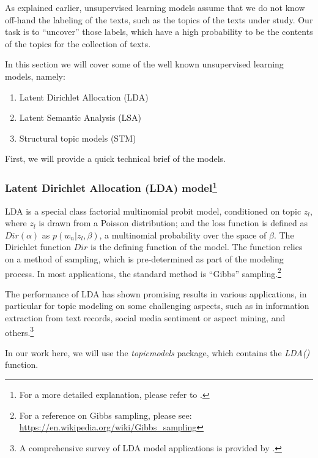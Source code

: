 \documentclass[
]{article}
\providecommand{\tightlist}{%
  \setlength{\itemsep}{0pt}\setlength{\parskip}{0pt}}
\begin{document}
As explained earlier, unsupervised learning models assume that we do not know off-hand the labeling of the texts, such as the topics of the texts under study. Our task is to ``uncover'' those labels, which have a high probability to be the contents of the topics for the collection of texts.

In this section we will cover some of the well known unsupervised learning models, namely:

\begin{enumerate}
\def\labelenumi{\arabic{enumi}.}
\tightlist
\item
  Latent Dirichlet Allocation (LDA)
\item
  Latent Semantic Analysis (LSA)
\item
  Structural topic models (STM)
\end{enumerate}

First, we will provide a quick technical brief of the models.

\hypertarget{latent-dirichlet-allocation-lda-model}{%
\subsubsection[Latent Dirichlet Allocation (LDA) model]{\texorpdfstring{Latent Dirichlet Allocation (LDA) model\footnote{For a more detailed explanation, please refer to \citep{blei2003}.}}{Latent Dirichlet Allocation (LDA) model}}\label{latent-dirichlet-allocation-lda-model}}

LDA is a special class factorial multinomial probit model, conditioned on topic \(z_l\), where \(z_l\) is drawn from a Poisson distribution; and the loss function is defined as \(Dir(\alpha)\) as \(p(w_n|z_l,\beta)\), a multinomial probability over the space of \(\beta\). The Dirichlet function \(Dir\) is the defining function of the model. The function relies on a method of sampling, which is pre-determined as part of the modeling process. In most applications, the standard method is ``Gibbs'' sampling.\footnote{For a reference on Gibbs sampling, please see: \url{https://en.wikipedia.org/wiki/Gibbs_sampling}}

The performance of LDA has shown promising results in various applications, in particular for topic modeling on some challenging aspects, such as in information extraction from text records, social media sentiment or aspect mining, and others.\footnote{A comprehensive survey of LDA model applications is provided by \citep{jelodar2019}.}

In our work here, we will use the \emph{topicmodels} package, which contains the \emph{LDA()} function.
\end{document}
